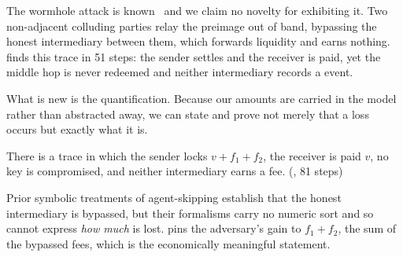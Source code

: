 The wormhole attack is known~\cite{malavolta2019anonymous} and we claim no
novelty for exhibiting it. Two non-adjacent colluding parties relay the
preimage out of band, bypassing the honest intermediary between them, which
forwards liquidity and earns nothing.
 finds this trace in 51 steps: the sender
settles and the receiver is paid, yet the middle hop is never redeemed and
neither intermediary records a  event.

What is new is the quantification. Because our amounts are carried in the model
rather than abstracted away, we can state and prove not merely that a loss
occurs but exactly what it is.

\begin{thrm}
\label{thm:wormhole}
There is a trace in which the sender locks $v + f_1 + f_2$, the receiver is
paid $v$, no key is compromised, and neither intermediary earns a fee.
\hfill(, 81 steps)
\end{thrm}

Prior symbolic treatments of agent-skipping establish that the honest
intermediary is bypassed, but their formalisms carry no numeric sort and so
cannot express \emph{how much} is lost.  pins the
adversary's gain to $f_1 + f_2$, the sum of the bypassed fees, which is the
economically meaningful statement.
